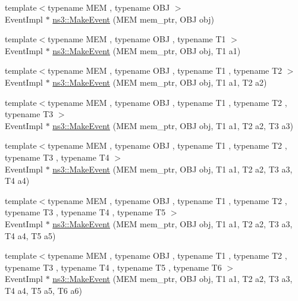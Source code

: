 \begin{DoxyCompactItemize}
\item 
{\footnotesize template$<$typename M\+EM , typename O\+BJ $>$ }\\Event\+Impl $\ast$ \hyperlink{group__makeeventmemptr_ga0e2905b2f105d6626b91262ed831c6fa}{ns3\+::\+Make\+Event} (M\+EM mem\+\_\+ptr, O\+BJ obj)
\item 
{\footnotesize template$<$typename M\+EM , typename O\+BJ , typename T1 $>$ }\\Event\+Impl $\ast$ \hyperlink{group__makeeventmemptr_ga910b4f11ac95304bc98e165f17c39126}{ns3\+::\+Make\+Event} (M\+EM mem\+\_\+ptr, O\+BJ obj, T1 a1)
\item 
{\footnotesize template$<$typename M\+EM , typename O\+BJ , typename T1 , typename T2 $>$ }\\Event\+Impl $\ast$ \hyperlink{group__makeeventmemptr_ga3e867e45d5a45ba42ab0648d999c71c4}{ns3\+::\+Make\+Event} (M\+EM mem\+\_\+ptr, O\+BJ obj, T1 a1, T2 a2)
\item 
{\footnotesize template$<$typename M\+EM , typename O\+BJ , typename T1 , typename T2 , typename T3 $>$ }\\Event\+Impl $\ast$ \hyperlink{group__makeeventmemptr_ga845eade6a6e8eee2b7c45225fe9816b2}{ns3\+::\+Make\+Event} (M\+EM mem\+\_\+ptr, O\+BJ obj, T1 a1, T2 a2, T3 a3)
\item 
{\footnotesize template$<$typename M\+EM , typename O\+BJ , typename T1 , typename T2 , typename T3 , typename T4 $>$ }\\Event\+Impl $\ast$ \hyperlink{group__makeeventmemptr_gaff41581be22a030416d7463f7ff7dfe8}{ns3\+::\+Make\+Event} (M\+EM mem\+\_\+ptr, O\+BJ obj, T1 a1, T2 a2, T3 a3, T4 a4)
\item 
{\footnotesize template$<$typename M\+EM , typename O\+BJ , typename T1 , typename T2 , typename T3 , typename T4 , typename T5 $>$ }\\Event\+Impl $\ast$ \hyperlink{group__makeeventmemptr_gade123cc667e303dc07f74c7d8f4838cc}{ns3\+::\+Make\+Event} (M\+EM mem\+\_\+ptr, O\+BJ obj, T1 a1, T2 a2, T3 a3, T4 a4, T5 a5)
\item 
{\footnotesize template$<$typename M\+EM , typename O\+BJ , typename T1 , typename T2 , typename T3 , typename T4 , typename T5 , typename T6 $>$ }\\Event\+Impl $\ast$ \hyperlink{group__makeeventmemptr_gaeb347f342e4aaf368fcc47f8229260a9}{ns3\+::\+Make\+Event} (M\+EM mem\+\_\+ptr, O\+BJ obj, T1 a1, T2 a2, T3 a3, T4 a4, T5 a5, T6 a6)
\end{DoxyCompactItemize}


